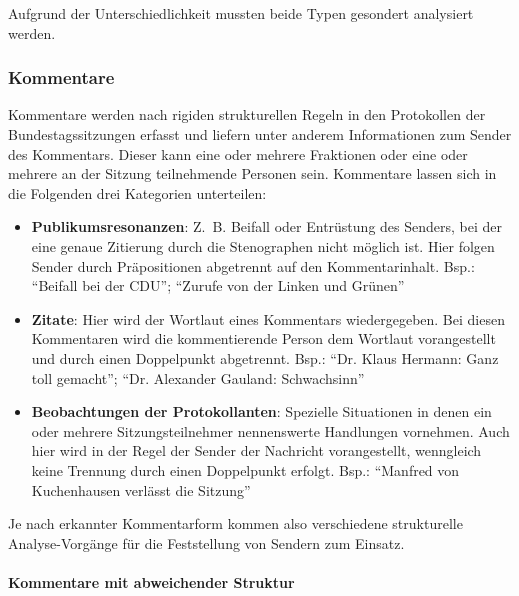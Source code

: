 Aufgrund der Unterschiedlichkeit mussten beide Typen gesondert analysiert werden.

\subsubsection{Kommentare}

Kommentare werden nach rigiden strukturellen Regeln in den Protokollen der
Bundestagssitzungen erfasst und liefern unter anderem Informationen zum
Sender des Kommentars. Dieser kann eine oder mehrere Fraktionen oder eine
oder mehrere an der Sitzung teilnehmende Personen sein. Kommentare lassen sich
in die Folgenden drei Kategorien unterteilen:

\begin{itemize}
    \item \textbf{Publikumsresonanzen}: Z.~B. Beifall oder Entrüstung des
        Senders, bei der eine genaue Zitierung durch die Stenographen nicht
        möglich ist. Hier folgen Sender durch Präpositionen abgetrennt auf
        den Kommentarinhalt. Bsp.: \enquote{Beifall bei der CDU};
        \enquote{Zurufe von der Linken und Grünen}

    \item \textbf{Zitate}: Hier wird der Wortlaut eines Kommentars
        wiedergegeben. Bei diesen Kommentaren wird die kommentierende Person
        dem Wortlaut vorangestellt und durch einen Doppelpunkt abgetrennt.
        Bsp.: \enquote{Dr. Klaus Hermann: Ganz toll gemacht}; \enquote{Dr.
        Alexander Gauland: Schwachsinn}

    \item \textbf{Beobachtungen der Protokollanten}: Spezielle Situationen in
        denen ein oder mehrere Sitzungsteilnehmer nennenswerte Handlungen
        vornehmen. Auch hier wird in der Regel der Sender der Nachricht
        vorangestellt, wenngleich keine Trennung durch einen Doppelpunkt
        erfolgt. Bsp.: \enquote{Manfred von Kuchenhausen verlässt die Sitzung}

\end{itemize}

Je nach erkannter Kommentarform kommen also verschiedene strukturelle
Analyse-Vorgänge für die Feststellung von Sendern zum Einsatz.

\paragraph{Kommentare mit abweichender Struktur}

